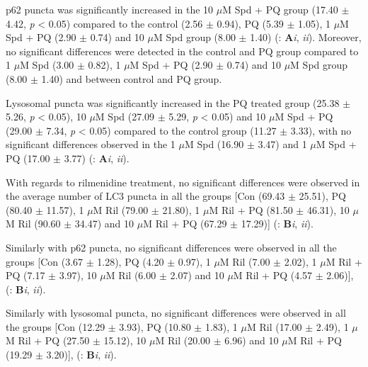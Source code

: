 p62 puncta was significantly increased in the 10 $\mu$M Spd + PQ group (17.40 $\pm$ 4.42, \textit{p} < 0.05) compared to the control (2.56 $\pm$ 0.94), PQ (5.39 $\pm$ 1.05), 1 $\mu$M Spd + PQ (2.90 $\pm$ 0.74) and 10 $\mu$M Spd group (8.00 $\pm$ 1.40) (: \textbf{A}\textit{i}, \textit{ii}). Moreover, no significant differences were detected in the control and PQ group compared to 1 $\mu$M Spd (3.00 $\pm$ 0.82), 1 $\mu$M Spd + PQ (2.90 $\pm$ 0.74) and 10 $\mu$M Spd group (8.00 $\pm$ 1.40) and between control and PQ group.

Lysosomal puncta was significantly increased in the PQ treated group (25.38 $\pm$ 5.26, \textit{p} < 0.05), 10 $\mu$M Spd (27.09 $\pm$ 5.29, \textit{p} < 0.05) and 10 $\mu$M Spd + PQ (29.00 $\pm$ 7.34, \textit{p} < 0.05) compared to the control group (11.27 $\pm$ 3.33), with no significant differences observed in the 1 $\mu$M Spd (16.90 $\pm$ 3.47) and 1 $\mu$M Spd + PQ (17.00 $\pm$ 3.77) (: \textbf{A}\textit{i}, \textit{ii}).

With regards to rilmenidine treatment, no significant differences were observed in the average number of LC3 puncta in all the groups [Con (69.43 $\pm$ 25.51), PQ (80.40 $\pm$ 11.57), 1 $\mu$M Ril (79.00 $\pm$ 21.80), 1 $\mu$M Ril + PQ (81.50 $\pm$ 46.31), 10 $\mu$M Ril (90.60 $\pm$ 34.47) and 10 $\mu$M Ril + PQ (67.29 $\pm$ 17.29)] (: \textbf{B}\textit{i}, \textit{ii}).

Similarly with p62 puncta, no significant differences were observed in all the groups [Con (3.67 $\pm$ 1.28), PQ (4.20 $\pm$ 0.97), 1 $\mu$M Ril (7.00 $\pm$ 2.02), 1 $\mu$M Ril + PQ (7.17 $\pm$ 3.97), 10 $\mu$M Ril (6.00 $\pm$ 2.07) and 10 $\mu$M Ril + PQ (4.57 $\pm$ 2.06)], (: \textbf{B}\textit{i}, \textit{ii}).

Similarly with lysosomal puncta, no significant differences were observed in all the groups [Con (12.29 $\pm$ 3.93), PQ (10.80 $\pm$ 1.83), 1 $\mu$M Ril (17.00 $\pm$ 2.49), 1 $\mu$M Ril + PQ (27.50 $\pm$ 15.12), 10 $\mu$M Ril (20.00 $\pm$ 6.96) and 10 $\mu$M Ril + PQ (19.29 $\pm$ 3.20)], (: \textbf{B}\textit{i}, \textit{ii}).

